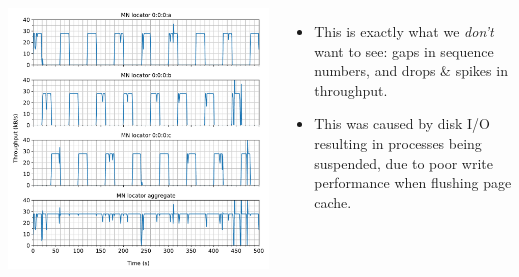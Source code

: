 \documentclass[25pt, a0paper, portrait]{tikzposter}
\begin{document}
\begin{columns}
{        \includegraphics[width=0.5\linewidth]{systems_issues_graphs/exp3/Throughput in 1s buckets vs Time on MN.pdf}
        \begin{itemize}
            \item This is exactly what we \textit{don't} want to see: gaps in sequence numbers, and drops \& spikes in throughput.
            \item This was caused by disk I/O resulting in processes being suspended, due to poor write performance when flushing page cache.
        \end{itemize}
    }
\end{columns}
\end{document}
